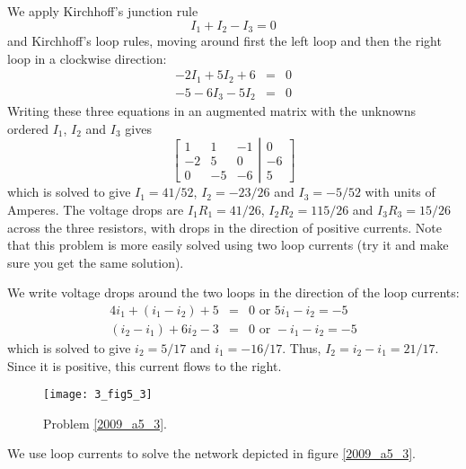 \vspace{2mm}
We apply Kirchhoff's junction rule 
\[
I_1 + I_2 - I_3 = 0 
\]
and Kirchhoff's loop rules, moving around first the left loop and then
the right loop in a clockwise direction:
\begin{eqnarray*}
-2I_1 + 5I_2 + 6 & = & 0 \\
-5 - 6I_3 - 5I_2 & = & 0 
\end{eqnarray*}
Writing these three equations in an augmented matrix with the unknowns 
ordered $I_1$, $I_2$ and $I_3$ gives 
\[
\left[ \begin{array}{ccc}
1 & 1 & -1 \\
-2 & 5 & 0 \\
0 & -5 & -6 
\end{array}
\right| 
\left.
\begin{array}{c}
0 \\ -6 \\ 5
\end{array}
\right]
\]
which is solved to give $I_1 = 41/52$, $I_2 = -23/26$ and $I_3 = -5/52$ 
with units of Amperes. The voltage drops are $I_1 R_1 = 41/26$, 
$I_2 R_2 = 115/26$ and $I_3 R_3 = 15/26$ across the three resistors, 
with drops in the direction of positive currents. Note that this problem 
is more easily solved using two loop currents (try it and make sure you 
get the same solution). 

\vspace{2mm}
We write voltage drops around the two loops in the direction of the 
loop currents:
\begin{eqnarray*}
4i_1 + (i_1-i_2) + 5 & = & 0 \mbox{\ \ or \ \ } 5i_1 - i_2 = -5 \\
(i_2-i_1) + 6i_2 -3  & = & 0 \mbox{\ \ or \ \ } -i_1 - i_2 = -5 
\end{eqnarray*}
which is solved to give $i_2 = 5/17$ and $i_1 = -16/17$. Thus, 
$I_2 = i_2-i_1 = 21/17$. Since it is positive, this current flows 
to the right.

\vspace{2mm}
\begin{figure}
\centerline{\texttt{[image: 3\_fig5\_3]}}
\caption{Problem \ref{2009_a5_3}.
\label{fig_a5_3}}
\end{figure}
We use loop currents to solve the network depicted in figure \ref{2009_a5_3}.

